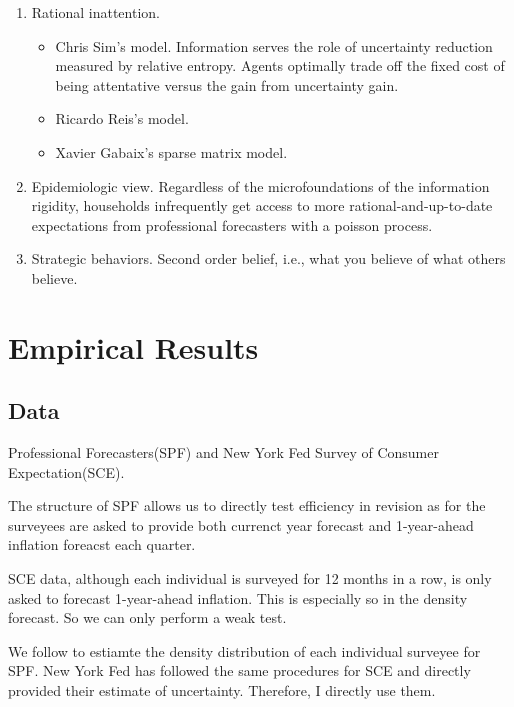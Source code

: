 \documentclass[]{article}
\begin{document}
\begin{enumerate}
\item Rational inattention. 
\begin{itemize}
	\item Chris Sim's model.\citet{sims2003implications} Information serves the role of uncertainty reduction measured by relative entropy. Agents optimally trade off the fixed cost of being attentative versus the gain from uncertainty gain.   
	\item Ricardo Reis's model. \citet{reis2006inattentive}
	\item Xavier Gabaix's sparse matrix model. \citet{gabaix2014sparsity}
\end{itemize}

\item Epidemiologic view. \citet{carroll2003macroeconomic} Regardless of the microfoundations of the information rigidity, households infrequently get access to more rational-and-up-to-date expectations from professional forecasters with a poisson process. 


\item Strategic behaviors. Second order belief, i.e., what you believe of what others believe. \citet{angeletos2009incomplete}



\end{enumerate}

\section{Empirical Results}\label{empirical}

\subsection{Data}


Professional Forecasters(SPF) and New York Fed Survey of Consumer Expectation(SCE). 

The structure of SPF allows us to directly test efficiency in revision as for the surveyees are asked to provide both currenct year forecast and 1-year-ahead inflation foreacst each quarter. 

SCE data, although each individual is surveyed for 12 months in a row, is only asked to forecast 1-year-ahead inflation. This is especially so in the density forecast. So we can only perform a weak test. 

We follow \citet{engelberg2009comparing} to estiamte the density distribution of each individual surveyee for SPF. New York Fed has followed the same procedures for SCE and directly provided their estimate of uncertainty. Therefore, I directly use them. 
\end{document}
